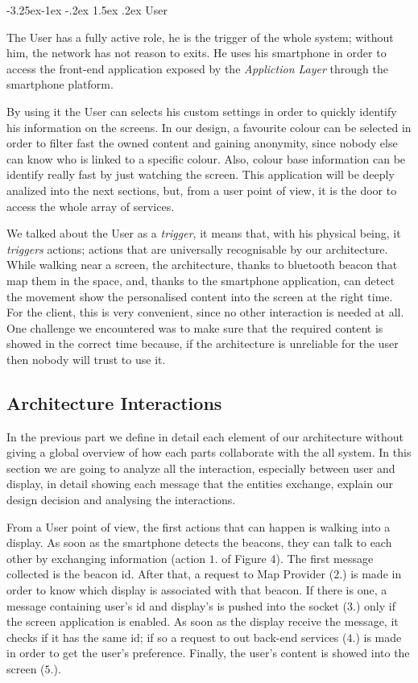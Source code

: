 \documentclass[]{usiinfbachelorproject}
\makeatletter
\newcommand\subsubsection{\@startsection{subsubsection}{3}{\z@}%
                {-3.25ex\@plus -1ex \@minus -.2ex}%
                {1.5ex \@plus .2ex}%
                {\normalfont\normalsize\bfseries}}
\makeatother
\begin{document}
\subsubsection{User}

The User has a fully active role, he is the trigger of the whole system; without him, the network has not reason to exits. He uses his smartphone in order to access the front-end application exposed by the \emph{Appliction Layer} through the smartphone platform.

By using it the User can selects his custom settings in order to quickly identify his information on the screens.
In our design, a favourite colour can be selected in order to filter fast the owned content and gaining anonymity, since nobody else can know who is linked to a specific colour. Also, colour base information can be identify really fast by just watching the screen.
This application will be deeply analized into the next sections, but, from a user point of view, it is the door to access the whole array of services.

We talked about the User as a \emph{trigger}, it means that, with his physical being, it \emph{triggers} actions; actions that are universally recognisable by our architecture. While walking near a screen, the architecture, thanks to bluetooth beacon that map them in the space, and, thanks to the smartphone application, can detect the movement show the personalised content into the screen at the right time. For the client, this is very convenient, since no other interaction is needed at all. One challenge we encountered was to make sure that the required content is showed in the correct time because, if the architecture is unreliable for the user then nobody will trust to use it.
 
 
\subsection{Architecture Interactions}

In the previous part we define in detail each element of our architecture without giving a global overview of how each parts collaborate with the all system. In this section we are going to analyze all the interaction, especially between user and display, in detail showing each message that the entities exchange, explain
 our design decision and analysing the interactions.

From a User point of view, the first actions that can happen is walking into a display. As soon as the smartphone detects the beacons, they can talk to each other by exchanging information (action $1.$ of Figure 4). The first message collected is the beacon id. After that, a request to Map Provider ($2.$) is made in order to know which display is associated with that beacon. If there is one, a message containing user's id and display's is pushed into the socket ($3.$) only if the screen application is enabled. As soon as the display receive the message, it checks if it has the same id; if so a request to out back-end services ($4.$) is made in order to get the user's preference. Finally, the user's content is showed into the screen ($5.$).
\end{document}
